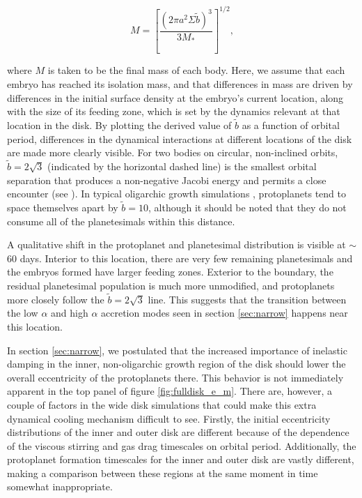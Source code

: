 \documentclass[twocolumn]{aastex63}
\begin{document}
\begin{equation}\label{eq:iso}
	M = \left[ \frac{\left( 2 \pi a^2 \Sigma \tilde{b} \right)^3}{3 M_{*}} \right]^{1/2},
\end{equation}

where $M$ is taken to be the final mass of each body. Here, we assume that each embryo has reached its isolation mass, and 
that differences in mass are driven by differences in the initial surface density at the embryo's current location, along with the 
size of its feeding zone, which is set by the dynamics relevant at that location in the disk. By plotting the derived value of $
\tilde{b}$ as a function of orbital period, differences in the dynamical interactions at different locations of the disk are made more 
clearly visible. For two bodies on circular, non-inclined orbits,  $\tilde{b} = 2
\sqrt{3}$ (indicated by the horizontal dashed line) is the smallest orbital separation that produces a non-negative Jacobi energy
and permits a close encounter (see \citet{naka88}). In typical oligarchic growth simulations \citep{kokubo98}, protoplanets tend 
to space themselves apart by $\tilde{b} = 10$, although it should be noted that they do not consume all of the planetesimals 
within this distance.

A qualitative shift in the protoplanet and planetesimal distribution is visible at $\sim$ 60 days. Interior to this location, there are 
very few remaining planetesimals and the embryos formed have larger feeding zones. Exterior to the boundary, the residual 
planetesimal population is much more unmodified, and protoplanets more closely follow the $\tilde{b} = 2 \sqrt{3}$ line. This 
suggests that the transition between the low $\alpha$ and high $\alpha$ accretion modes seen in section \ref{sec:narrow} 
happens near this location.

In section \ref{sec:narrow}, we postulated that the increased importance of inelastic damping in the inner, non-oligarchic growth 
region of the disk should lower the overall eccentricity of the protoplanets there. This behavior is not immediately apparent in the 
top panel of figure \ref{fig:fulldisk_e_m}. There are, however, a couple of factors in the wide disk simulations that could make this 
extra dynamical cooling mechanism difficult to see. Firstly, the initial eccentricity distributions of the inner and outer disk are 
different because of the dependence of the viscous stirring and gas drag timescales on orbital period. Additionally, the 
protoplanet formation timescales for the inner and outer disk are vastly different, making a comparison between these regions at 
the same moment in time somewhat inappropriate.
\end{document}
